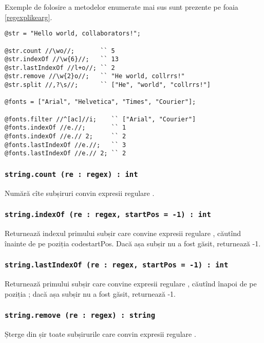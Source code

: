 Exemple de folosire a metodelor enumerate mai sus sunt prezente pe foaia \ref{regexplikearg}.

\begin{lstlisting}[caption=Expresii regulare în calitate de argumente, label=regexplikearg]
@str = "Hello world, collaborators!";

@str.count //\wo//;       `` 5
@str.indexOf //\w{6}//;   `` 13
@str.lastIndexOf //l+o//; `` 2
@str.remove //\w{2}o//;   `` "He world, collrrs!"
@str.split //,?\s//;      `` ["He", "world", "collrrs!"]

@fonts = ["Arial", "Helvetica", "Times", "Courier"];

@fonts.filter //^[ac]//i;    `` ["Arial", "Courier"]
@fonts.indexOf //e.//;       `` 1
@fonts.indexOf //e.// 2;     `` 2
@fonts.lastIndexOf //e.//;   `` 3
@fonts.lastIndexOf //e.// 2; `` 2
\end{lstlisting}

\subsubsection{\lstinline|string.count (re : regex) : int|}

Numără cîte subșiruri convin expresii regulare .

\subsubsection{\lstinline|string.indexOf (re : regex, startPos = -1) : int|}

Returnează indexul primului subșir care convine expresii regulare , căutînd înainte de pe poziția code{startPos}. Dacă așa subșir nu a fost găsit, returnează -1.

\subsubsection{\lstinline|string.lastIndexOf (re : regex, startPos = -1) : int|}

Returnează primului subșir care convine expresii regulare , căutînd înapoi de pe poziția ; dacă așa subșir nu a fost găsit, returnează -1.

\subsubsection{\lstinline|string.remove (re : regex) : string|}

Șterge din șir toate subșirurile care convin expresii regulare .

